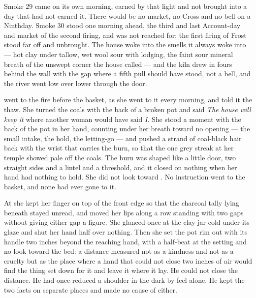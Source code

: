 Smoke 29 came on its own morning, earned by that light and not brought into a day that had not earned it. There would be no market, no Cross and no bell on a Ninthday. Smoke 30 stood one morning ahead, the third and last Account-day and market of the second firing, and was not reached for; the first firing of Frost stood far off and unbrought. The house woke into the smells it always woke into --- hot clay under tallow, wet wool sour with lodging, the faint sour mineral breath of the unswept corner the house called  --- and the kiln drew in fours behind the wall with the gap where a fifth pull should have stood, not a bell, and the river went low over lower through the door.

 went to the fire before the basket, as she went to it every morning, and told it the thaw. She turned the coals with the back of a broken pot and said \emph{The house will keep it} where another woman would have said \emph{I}. She stood a moment with the back of the pot in her hand, counting under her breath toward no opening --- the small intake, the hold, the letting-go --- and pushed a strand of coal-black hair back with the wrist that carries the burn, so that the one grey streak at her temple showed pale off the coals. The burn was shaped like a little door, two straight sides and a lintel and a threshold, and it closed on nothing when her hand had nothing to hold. She did not look toward . No instruction went to the basket, and none had ever gone to it.

At  she kept her finger on top of the front edge so that the charcoal tally lying beneath stayed unread, and moved her lips along a row standing with two gaps without giving either gap a figure. She glanced once at the clay jar cold under its glaze and shut her hand half over nothing. Then she set the pot rim out with its handle two inches beyond the reaching hand, with a half-beat at the setting and no look toward the bed: a distance measured not as a kindness and not as a cruelty but as the place where a hand that could not close two inches of air would find the thing set down for it and leave it where it lay. He could not close the distance. He had once reduced a shoulder in the dark by feel alone. He kept the two facts on separate places and made no cause of either.

\scenebreak

